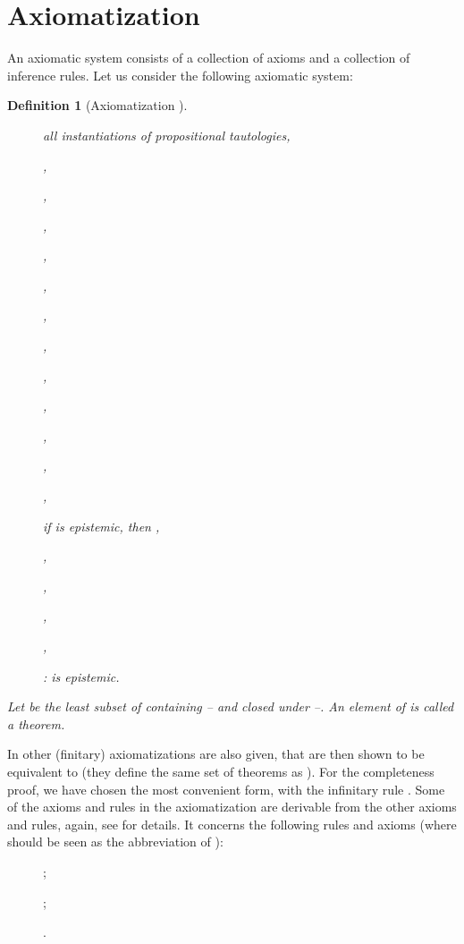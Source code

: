 \documentclass{article}[12pt]
\newtheorem{definition}{Definition}
\begin{document}
\section{Axiomatization}
An axiomatic system consists of a collection of axioms and a collection of inference rules.
Let us consider the following axiomatic system:
\begin{definition}[Axiomatization ]
\begin{description}
\item[] all instantiations of propositional tautologies,
\item[] ,
\item[] ,
\item[] ,
\item[] ,
\item[] ,
\item[] ,
\item[] ,
\item[] ,
\item[] ,
\item[] ,
\item[] ,
\item[] ,
\item[] if  is epistemic, then ,
\item[] ,
\item[] ,
\item[] ,
\item[] , \item[] :  is epistemic.
\end{description}


\bigskip

\noindent
Let  be the least subset of  containing -- and closed under --. An element of  is called a {\em theorem}.
\end{definition}
In \cite{balbianietal:2008} other (finitary) axiomatizations are also given, that are then shown to be equivalent to  (they define the same set of theorems as ). For the completeness proof, we have chosen the most convenient form, with the infinitary rule .  Some of the axioms and rules in the axiomatization  are derivable from the other axioms and rules, again, see \cite{balbianietal:2008} for details. It concerns the following rules and axioms (where  should be seen as the abbreviation of ):
\begin{description}
\item[] ;
\item[] ; 
\item[] . \end{description}
\end{document}
